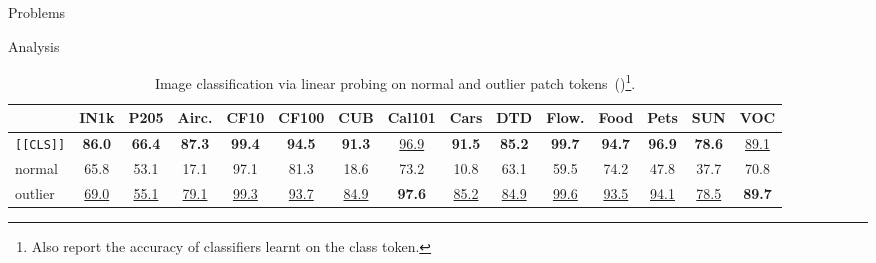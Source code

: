 \documentclass[aspectratio=169]{beamer}
\begin{document}
\begin{section}{Problems}
\begin{subsection}{Analysis}
\begin{frame}
\begin{table}[t]
    \centering
    \caption{
        Image classification via linear probing on normal and outlier patch tokens~(\cite{darcetVisionTransformersNeed2024})\footnote{Also report the accuracy of classifiers learnt on the class token.}.
      }
    \begin{tabular}{@{} l *{14}{c@{\hspace{4pt}}} @{}}
      \toprule
      & IN1k & P205 & Airc. & CF10 & CF100 & CUB & Cal101 & Cars & DTD & Flow. & Food & Pets & SUN & VOC \\
      \midrule
      \texttt{[\texttt{[CLS]}]} & \textbf{86.0} & \textbf{66.4} & \textbf{87.3} & \textbf{99.4} & \textbf{94.5} & \textbf{91.3} & \underline{96.9} & \textbf{91.5} & \textbf{85.2} & \textbf{99.7} & \textbf{94.7} & \textbf{96.9} & \textbf{78.6} & \underline{89.1} \\
      normal & 65.8 & 53.1 & 17.1 & 97.1 & 81.3 & 18.6 & 73.2 & 10.8 & 63.1 & 59.5 & 74.2 & 47.8 & 37.7 & 70.8 \\
      outlier & \underline{69.0} & \underline{55.1} & \underline{79.1} & \underline{99.3} & \underline{93.7} & \underline{84.9} & \textbf{97.6} & \underline{85.2} & \underline{84.9} & \underline{99.6} & \underline{93.5} & \underline{94.1} & \underline{78.5} & \textbf{89.7} \\
      \bottomrule
    \end{tabular}
    \vspace{-1em}
    \label{tab:logreg_weird_patches_image_classif}
\end{table}

\end{frame}

\end{subsection}

\end{section}
\end{document}
